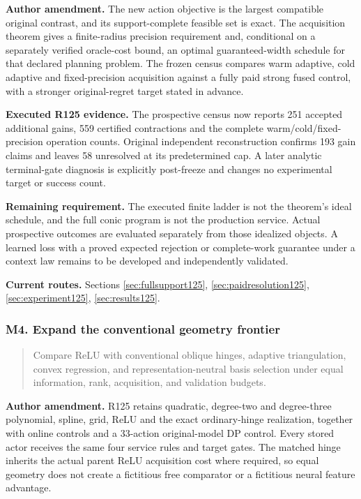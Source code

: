\noindent\textbf{Author amendment.} The new action objective is the largest compatible original contrast, and its support-complete feasible set is exact. The acquisition theorem gives a finite-radius precision requirement and, conditional on a separately verified oracle-cost bound, an optimal guaranteed-width schedule for that declared planning problem. The frozen census compares warm adaptive, cold adaptive and fixed-precision acquisition against a fully paid strong fused control, with a stronger original-regret target stated in advance.

\noindent\textbf{Executed R125 evidence.} The prospective census now reports 251 accepted additional gains, 559 certified contractions and the complete warm/cold/fixed-precision operation counts. Original independent reconstruction confirms 193 gain claims and leaves 58 unresolved at its predetermined cap. A later analytic terminal-gate diagnosis is explicitly post-freeze and changes no experimental target or success count.

\noindent\textbf{Remaining requirement.} The executed finite ladder is not the theorem's ideal schedule, and the full conic program is not the production service. Actual prospective outcomes are evaluated separately from those idealized objects. A learned loss with a proved expected rejection or complete-work guarantee under a context law remains to be developed and independently validated.

\noindent\textbf{Current routes.} Sections \ref{sec:fullsupport125}, \ref{sec:paidresolution125}, \ref{sec:experiment125}, \ref{sec:results125}.

\subsubsection{M4. Expand the conventional geometry frontier}

\begin{quote}\small
Compare ReLU with conventional oblique hinges, adaptive triangulation, convex regression, and representation-neutral basis selection under equal information, rank, acquisition, and validation budgets.
\end{quote}

\noindent\textbf{Author amendment.} R125 retains quadratic, degree-two and degree-three polynomial, spline, grid, ReLU and the exact ordinary-hinge realization, together with online controls and a 33-action original-model DP control. Every stored actor receives the same four service rules and target gates. The matched hinge inherits the actual parent ReLU acquisition cost where required, so equal geometry does not create a fictitious free comparator or a fictitious neural feature advantage.

